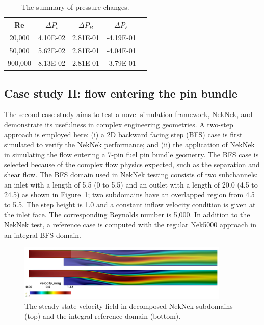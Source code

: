 \begin{table} \centering \small
 \begin{tabular}{ccccc} \hline \hline
   Re        & $\Delta P_t$   & $\Delta P_B$  & $\Delta P_F$  \\ \hline
   20,000    & 4.10E-02       & 2.81E-01      & -4.19E-01  \\
   50,000    & 5.62E-02       & 2.81E-01      & -4.04E-01  \\
   900,000   & 8.13E-02       & 2.81E-01      & -3.79E-01  \\
   \hline \hline
\end{tabular}
 \caption{The summary of pressure changes.}
 \label{tab:full core}
\end{table}



\subsection{Case study II: flow entering the pin bundle}
\label{sec:results2}

The second case study aims to test a novel simulation framework, NekNek, and demonstrate its usefulness in complex engineering geometries. A two-step approach is employed here: (i) a 2D backward facing step (BFS) case is first simulated to verify the NekNek performance; and (ii) the application of NekNek in simulating the flow entering a 7-pin fuel pin bundle geometry. The BFS case is selected because of the complex flow physics expected, such as the separation and shear flow. The BFS domain used in NekNek testing consists of two subchannels: an inlet with a length of 5.5 (0 to 5.5) and an outlet with a length of 20.0 (4.5 to 24.5) as shown in Figure~\ref{fig:bfs_domain}; two subdomains have an overlapped region from 4.5 to 5.5. The step height is 1.0 and a constant inflow velocity condition is given at the inlet face. The corresponding Reynolds number is 5,000. In addition to the NekNek test, a reference case is computed with the regular Nek5000 approach in an integral BFS domain. 


\begin{figure}[!ht]
\centering
\includegraphics[width=0.9\textwidth]{./figures/bfs_vel.png}
\caption{The steady-state velocity field in decomposed NekNek subdomains (top) and the integral reference domain (bottom). }
\label{fig:bfs_domain}
\end{figure}


